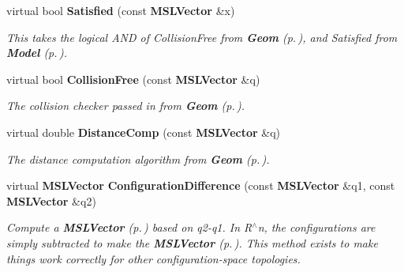 \begin{CompactItemize}
virtual bool {\bf Satisfied} (const {\bf MSLVector} \&x)
\begin{CompactList}\small\item\em This takes the logical AND of Collision\-Free from {\bf Geom} {\rm (p.\,\pageref{classGeom})}, and Satisfied from {\bf Model} {\rm (p.\,\pageref{classModel})}.\item\end{CompactList}\item 
virtual bool {\bf Collision\-Free} (const {\bf MSLVector} \&q)
\begin{CompactList}\small\item\em The collision checker passed in from {\bf Geom} {\rm (p.\,\pageref{classGeom})}.\item\end{CompactList}\item 
virtual double {\bf Distance\-Comp} (const {\bf MSLVector} \&q)
\begin{CompactList}\small\item\em The distance computation algorithm from {\bf Geom} {\rm (p.\,\pageref{classGeom})}.\item\end{CompactList}\item 
virtual {\bf MSLVector} {\bf Configuration\-Difference} (const {\bf MSLVector} \&q1, const {\bf MSLVector} \&q2)
\begin{CompactList}\small\item\em Compute a {\bf MSLVector} {\rm (p.\,\pageref{classMSLVector})} based on q2-q1. In R$^\wedge$n, the configurations are simply subtracted to make the {\bf MSLVector} {\rm (p.\,\pageref{classMSLVector})}. This method exists to make things work correctly for other configuration-space topologies.\item\end{CompactList}\end{CompactItemize}
